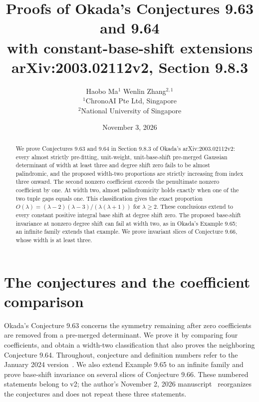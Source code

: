 \documentclass[11pt,a4paper]{article}
\title{Proofs of Okada's Conjectures 9.63 and 9.64\\with constant-base-shift extensions\\[3pt]
\large arXiv:2003.02112v2, Section 9.8.3}
\author{Haobo Ma$^{1}$ \qquad Wenlin Zhang$^{2,1}$\\[4pt]
\small $^{1}$ChronoAI Pte Ltd, Singapore\\
\small $^{2}$National University of Singapore}
\date{November 3, 2026}
\begin{document}
\maketitle
\begin{abstract}
We prove Conjectures 9.63 and 9.64 in
Section 9.8.3 of Okada's arXiv:2003.02112v2: every almost strictly pre-fitting, unit-weight,
unit-base-shift pre-merged Gaussian determinant of width at least three
and degree shift zero fails to be almost palindromic, and the proposed
width-two proportions are strictly increasing from index three onward.
The second nonzero coefficient exceeds the penultimate nonzero coefficient
by one. At width two, almost palindromicity holds exactly when one of the
two tuple gaps equals one. This classification gives the exact proportion
$O(\lambda)=(\lambda-2)(\lambda-3)/(\lambda(\lambda+1))$ for $\lambda\ge2$.
These conclusions extend to every constant positive integral base shift
at degree shift zero. The proposed base-shift invariance at nonzero degree
shift can fail at width two, as in Okada's Example 9.65; an infinite
family extends that example. We prove invariant slices of Conjecture 9.66,
whose width is at least three.
\end{abstract}

\section{The conjectures and the coefficient comparison}

Okada's Conjecture 9.63 concerns the symmetry remaining after zero
coefficients are removed from a pre-merged determinant. We prove it by
comparing four coefficients, and obtain a width-two classification that
also proves the neighboring Conjecture 9.64. Throughout, conjecture and
definition numbers refer to the January 2024 version~\cite{okada}.
We also extend Example 9.65 to an infinite family and prove
base-shift invariance on several slices of Conjecture 9.66. These numbered
statements belong to v2; the author's November 2, 2026 manuscript~\cite{okada-current}
reorganizes the conjectures and does not repeat these three statements.
\end{document}
